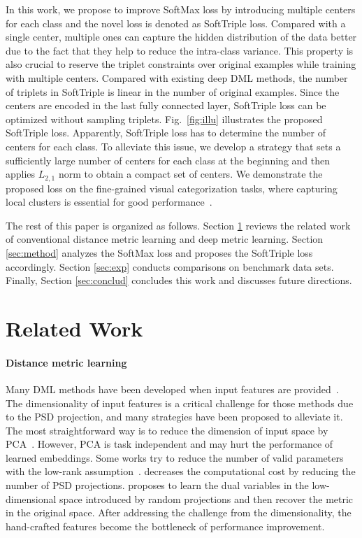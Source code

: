 \documentclass[10pt,twocolumn,letterpaper]{article}
\begin{document}
In this work, we propose to improve SoftMax loss by introducing multiple centers for each class and the novel loss is denoted as SoftTriple loss. Compared with a single center, multiple ones can capture the hidden distribution of the data better due to the fact that they help to reduce the intra-class variance. This property is also crucial to reserve the triplet constraints over original examples while training with multiple centers. Compared with existing deep DML methods, the number of triplets in SoftTriple is linear in the number of original examples. Since the centers are encoded in the last fully connected layer, SoftTriple loss can be optimized without sampling triplets. Fig.~\ref{fig:illu} illustrates the proposed SoftTriple loss. Apparently, SoftTriple loss has to determine the number of centers for each class. To alleviate this issue, we develop a strategy that sets a sufficiently large number of centers for each class at the beginning and then applies $L_{2,1}$ norm to obtain a compact set of centers. We demonstrate the proposed loss on the fine-grained visual categorization tasks, where capturing local clusters is essential for good performance~\cite{QianJZL15}.

The rest of this paper is organized as follows. Section \ref{sec:related} reviews the related work of conventional distance metric learning and deep metric learning. Section \ref{sec:method} analyzes the SoftMax loss and proposes the SoftTriple loss accordingly. Section \ref{sec:exp} conducts comparisons on benchmark data sets. Finally, Section \ref{sec:conclud} concludes this work and discusses future directions.


\section{Related Work}
\label{sec:related}
\paragraph{Distance metric learning}
Many DML methods have been developed when input features are provided~\cite{WeinbergerS09,XingNJR02}. The dimensionality of input features is a critical challenge for those methods due to the PSD projection, and many strategies have been proposed to alleviate it. The most straightforward way is to reduce the dimension of input space by PCA~\cite{WeinbergerS09}. However, PCA is task independent and may hurt the performance of learned embeddings. Some works try to reduce the number of valid parameters with the low-rank assumption~\cite{LimLM13}. \cite{QianJY0Z15} decreases the computational cost by reducing the number of PSD projections. \cite{QianJZL15} proposes to learn the dual variables in the low-dimensional space introduced by random projections and then recover the metric in the original space. After addressing the challenge from the dimensionality, the hand-crafted features become the bottleneck of performance improvement. 
\end{document}
